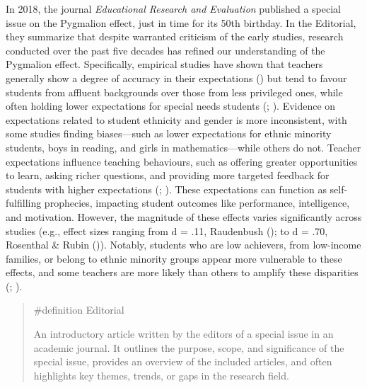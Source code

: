 \documentclass[
  letterpaper,
]{book}
\begin{document}
In 2018, the journal \emph{Educational Research and Evaluation}
published a special issue on the Pygmalion effect, just in time for its
50th birthday. In the Editorial, they summarize that despite warranted
criticism of the early studies, research conducted over the past five
decades has refined our understanding of the Pygmalion effect.
Specifically, empirical studies have shown that teachers generally show
a degree of accuracy in their expectations
() but tend to
favour students from affluent backgrounds over those from less
privileged ones, while often holding lower expectations for special
needs students (;
).
Evidence on expectations related to student ethnicity and gender is more
inconsistent, with some studies finding biases---such as lower
expectations for ethnic minority students, boys in reading, and girls in
mathematics---while others do not. Teacher expectations influence
teaching behaviours, such as offering greater opportunities to learn,
asking richer questions, and providing more targeted feedback for
students with higher expectations (; ). These expectations can function as self-fulfilling prophecies,
impacting student outcomes like performance, intelligence, and
motivation. However, the magnitude of these effects varies significantly
across studies (e.g., effect sizes ranging from d = .11, Raudenbush
(); to d = .70, Rosenthal \& Rubin
()). Notably, students who are
low achievers, from low-income families, or belong to ethnic minority
groups appear more vulnerable to these effects, and some teachers are
more likely than others to amplify these disparities
(;
).

\begin{quote}
\label{def-editorial}{\#definition} Editorial

An introductory article written by the editors of a special issue in an
academic journal. It outlines the purpose, scope, and significance of
the special issue, provides an overview of the included articles, and
often highlights key themes, trends, or gaps in the research field.
\end{quote}
\end{document}
